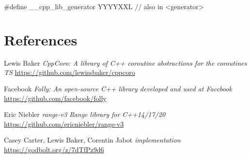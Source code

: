 \documentclass{wg21}
\begin{document}
\begin{addedblock}
\begin{codeblock}
    #define __cpp_lib_generator YYYYXXL // also in <generator>
\end{codeblock}
\end{addedblock}

\newpage
\section{References}
\renewcommand{\section}[2]{}%



\begin{thebibliography}{9}
    Lewis Baker
    \emph{CppCoro: A library of C++ coroutine abstractions for the coroutines TS}\newline
    \url{https://github.com/lewissbaker/cppcoro}

    Facebook
    \emph{Folly: An open-source C++ library developed and used at Facebook}\newline
    \url{https://github.com/facebook/folly}


    Eric Niebler
    \emph{range-v3 Range library for C++14/17/20}\newline
    \url{https://github.com/ericniebler/range-v3}

    Casey Carter, Lewis Baker, Corentin Jabot
    \emph{ implementation}\newline
    \url{https://godbolt.org/z/7dTfPz9d6}

\end{thebibliography}
\end{document}
